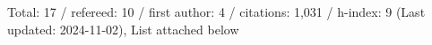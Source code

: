 Total: 17 / refereed: 10 / first author: 4 / citations: 1,031 / h-index: 9 (Last updated: 2024-11-02), List attached below